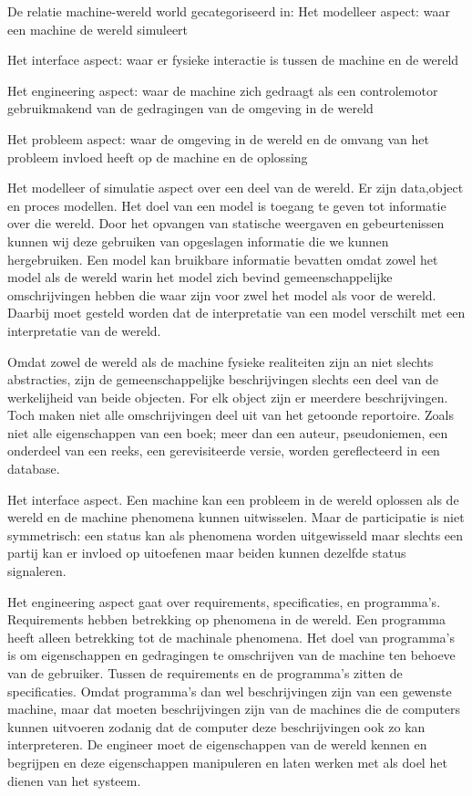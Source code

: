 De relatie machine-wereld world gecategoriseerd in: 
Het modelleer aspect: waar een machine de wereld simuleert 

Het interface aspect: waar er fysieke interactie is tussen de machine en de wereld 

Het engineering aspect: waar de machine zich gedraagt als een controlemotor gebruikmakend van de gedragingen van de omgeving in de wereld 

Het probleem aspect: waar de omgeving in de wereld en de omvang van het probleem invloed heeft op de machine en de oplossing 

Het modelleer  of simulatie aspect over een deel van de wereld. Er zijn data,object en proces modellen. Het doel van een model is toegang te geven tot informatie over die wereld. Door het opvangen van statische weergaven en gebeurtenissen kunnen wij deze gebruiken van opgeslagen informatie die we kunnen hergebruiken. Een model kan bruikbare informatie bevatten omdat zowel het model als de wereld warin het model zich bevind gemeenschappelijke omschrijvingen hebben die waar zijn voor zwel het model als voor de wereld. Daarbij moet gesteld worden dat de interpretatie van een model verschilt met een interpretatie van de wereld. 

Omdat zowel de wereld als de machine fysieke realiteiten zijn an niet slechts abstracties, zijn de gemeenschappelijke beschrijvingen slechts een deel van de werkelijheid van beide objecten. For elk object zijn er meerdere beschrijvingen. Toch maken niet alle omschrijvingen deel uit van het getoonde reportoire. Zoals niet alle eigenschappen van een boek; meer dan een auteur, pseudoniemen, een onderdeel van een reeks, een gerevisiteerde versie, worden gereflecteerd in een database.  

Het interface aspect. Een machine kan een probleem in de wereld oplossen als de wereld en de machine phenomena kunnen uitwisselen. Maar de participatie is niet symmetrisch: een status kan als phenomena worden uitgewisseld maar slechts een partij kan er invloed op uitoefenen maar beiden kunnen dezelfde status signaleren. 

Het engineering aspect gaat over requirements, specificaties, en programma’s. Requirements hebben betrekking op phenomena in de wereld. Een programma heeft alleen betrekking tot de machinale phenomena. Het doel van programma’s is om eigenschappen en gedragingen te omschrijven van de machine ten behoeve van de gebruiker. Tussen de requirements en de programma’s zitten de specificaties. Omdat programma’s dan wel beschrijvingen zijn van een gewenste machine, maar dat moeten beschrijvingen zijn van de  machines  die de computers kunnen uitvoeren zodanig dat de computer deze beschrijvingen ook zo kan interpreteren. De engineer moet  de eigenschappen van de wereld kennen en begrijpen en deze eigenschappen manipuleren en laten werken met als doel het dienen van het systeem. 

